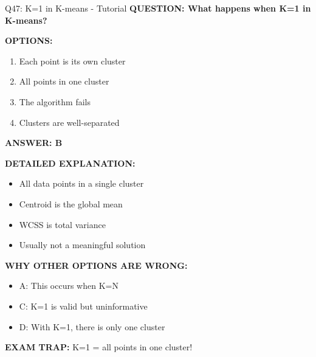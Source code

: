 \documentclass[8pt]{beamer}
\begin{document}
	\begin{frame}{Q47: K=1 in K-means - Tutorial}
		\fontsize{6.5}{7.5}\selectfont
		\textbf{QUESTION: What happens when K=1 in K-means?}
		
		\vspace{0.1cm}
		\textbf{OPTIONS:}
		\begin{enumerate}
			\item Each point is its own cluster
			\item All points in one cluster
			\item The algorithm fails
			\item Clusters are well-separated
		\end{enumerate}
		
		\vspace{0.1cm}
		\textcolor{myblue}{\textbf{ANSWER: B}}
		
		\vspace{0.1cm}
		\textbf{DETAILED EXPLANATION:}
		\begin{itemize}
			\item All data points in a single cluster
			\item Centroid is the global mean
			\item WCSS is total variance
			\item Usually not a meaningful solution
		\end{itemize}
		
		\vspace{0.1cm}
		\textcolor{myred}{\textbf{WHY OTHER OPTIONS ARE WRONG:}}
		\begin{itemize}
			\item \textcolor{myred}{A:} This occurs when K=N
			\item \textcolor{myred}{C:} K=1 is valid but uninformative
			\item \textcolor{myred}{D:} With K=1, there is only one cluster
		\end{itemize}
		
		\textcolor{myred}{\textbf{EXAM TRAP:}} K=1 = \textcolor{myblue}{all points in one cluster}!
	\end{frame}
	
\end{document}
